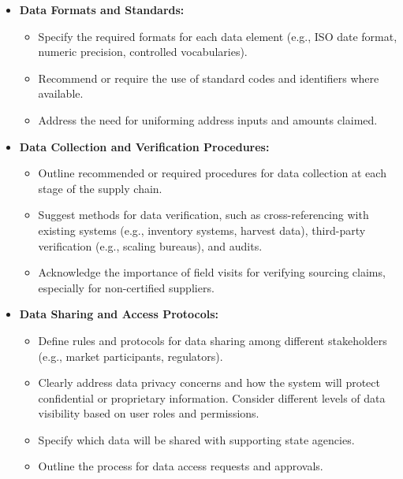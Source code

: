 \documentclass[a4paper, 11pt]{article}
\begin{document}
\begin{itemize}
    \item \textbf{Data Formats and Standards:}
        \begin{itemize}
            \item Specify the required formats for each data element (e.g., ISO date format, numeric precision, controlled vocabularies).
            \item Recommend or require the use of standard codes and identifiers where available.
            \item Address the need for uniforming address inputs and amounts claimed.
        \end{itemize}

    \item \textbf{Data Collection and Verification Procedures:}
        \begin{itemize}
            \item Outline recommended or required procedures for data collection at each stage of the supply chain.
            \item Suggest methods for data verification, such as cross-referencing with existing systems (e.g., inventory systems, harvest data), third-party verification (e.g., scaling bureaus), and audits.
            \item Acknowledge the importance of field visits for verifying sourcing claims, especially for non-certified suppliers.
        \end{itemize}

    \item \textbf{Data Sharing and Access Protocols:}
        \begin{itemize}
            \item Define rules and protocols for data sharing among different stakeholders (e.g., market participants, regulators).
            \item Clearly address data privacy concerns and how the system will protect confidential or proprietary information. Consider different levels of data visibility based on user roles and permissions.
            \item Specify which data will be shared with supporting state agencies.
            \item Outline the process for data access requests and approvals.
        \end{itemize}


\end{itemize}
\end{document}

